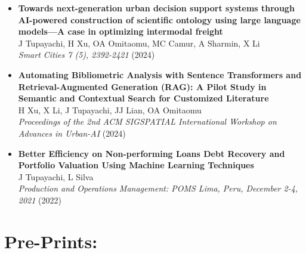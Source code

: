 \documentclass[10pt, letterpaper]{article}
\begin{document}
\begin{itemize}[left=0pt]
        \item \textbf{Towards next-generation urban decision support systems through AI-powered construction of scientific ontology using large language models—A case in optimizing intermodal freight} \\
        J Tupayachi, H Xu, OA Omitaomu, MC Camur, A Sharmin, X Li \\
        \textit{Smart Cities 7 (5), 2392-2421} (2024) \\
    
        \item \textbf{Automating Bibliometric Analysis with Sentence Transformers and Retrieval-Augmented Generation (RAG): A Pilot Study in Semantic and Contextual Search for Customized Literature} \\
        H Xu, X Li, J Tupayachi, JJ Lian, OA Omitaomu \\
        \textit{Proceedings of the 2nd ACM SIGSPATIAL International Workshop on Advances in Urban-AI} (2024) \\
    
        \item \textbf{Better Efficiency on Non-performing Loans Debt Recovery and Portfolio Valuation Using Machine Learning Techniques} \\
        J Tupayachi, L Silva \\
        \textit{Production and Operations Management: POMS Lima, Peru, December 2-4, 2021} (2022) \\
    
    


    \end{itemize}
    

    \section*{Pre-Prints:}
\end{document}
